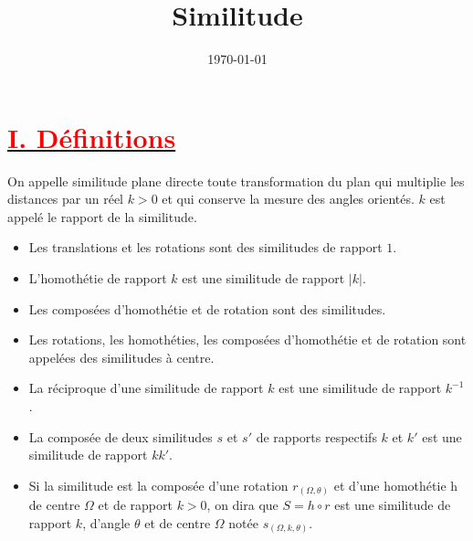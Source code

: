\documentclass[12pt]{article}
\title{\textbf{Similitude}}
\date{\today}
\begin{document}
\maketitle
\newpage
\section*{\underline{\textbf{\textcolor{red}{I. Définitions}}}}
On appelle similitude plane directe toute transformation du plan qui multiplie les distances par un réel $k > 0$ et qui conserve la mesure des angles orientés. $k$ est appelé le rapport de la similitude.
\begin{itemize}
    \item Les translations et les rotations sont des similitudes de rapport $1$.
    \item L'homothétie de rapport $k$ est une similitude de rapport $|k|$.
    \item Les composées d'homothétie et de rotation sont des similitudes.
    \item Les rotations, les homothéties, les composées d'homothétie et de rotation sont appelées des similitudes à centre.
    \item La réciproque d'une similitude de rapport $k$ est une similitude de rapport $k^{-1}$.
    \item La composée de deux similitudes $s$ et $s'$ de rapports respectifs $k$ et $k'$ est une similitude de rapport $kk'$.
    \item Si la similitude est la composée d'une rotation $r_{(\Omega,\theta)}$ et d'une homothétie h de centre $\Omega$ et de rapport $k > 0$, on dira que $S = h \circ r$ est une similitude de rapport $k$, d'angle $\theta$ et de centre $\Omega$ notée $s_{(\Omega,k,\theta)}$.
\end{itemize}
\end{document}
